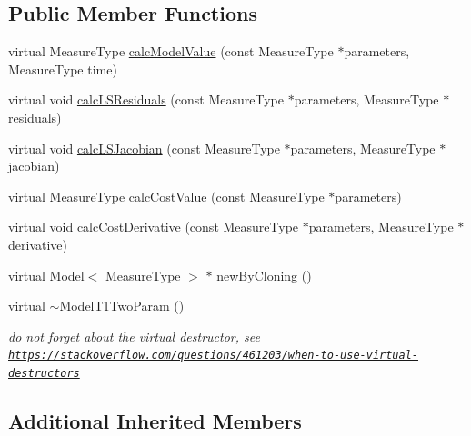 \subsection*{Public Member Functions}
\begin{DoxyCompactItemize}
\item 
virtual Measure\+Type \hyperlink{class_ox_1_1_model_t1_two_param_aaa8218e3d53e1913589d272bcbb62b47}{calc\+Model\+Value} (const Measure\+Type $\ast$parameters, Measure\+Type time)
\item 
virtual void \hyperlink{class_ox_1_1_model_t1_two_param_a8c02d34fac5a35310f6ee60209f70d45}{calc\+L\+S\+Residuals} (const Measure\+Type $\ast$parameters, Measure\+Type $\ast$residuals)
\item 
virtual void \hyperlink{class_ox_1_1_model_t1_two_param_af5952a47062e6edffe78f8594cc220e4}{calc\+L\+S\+Jacobian} (const Measure\+Type $\ast$parameters, Measure\+Type $\ast$jacobian)
\item 
virtual Measure\+Type \hyperlink{class_ox_1_1_model_t1_two_param_ab4ec672167094e84f2fddc5d052d528c}{calc\+Cost\+Value} (const Measure\+Type $\ast$parameters)
\item 
virtual void \hyperlink{class_ox_1_1_model_t1_two_param_a328e0fdc6b5769ecc3327596c9b12be3}{calc\+Cost\+Derivative} (const Measure\+Type $\ast$parameters, Measure\+Type $\ast$derivative)
\item 
virtual \hyperlink{class_ox_1_1_model}{Model}$<$ Measure\+Type $>$ $\ast$ \hyperlink{class_ox_1_1_model_t1_two_param_aa090c6834141f00a966eebd6b0415e44}{new\+By\+Cloning} ()
\item 
virtual \hyperlink{class_ox_1_1_model_t1_two_param_ae6870d10db397016649989969c613f32}{$\sim$\+Model\+T1\+Two\+Param} ()\hypertarget{class_ox_1_1_model_t1_two_param_ae6870d10db397016649989969c613f32}{}\label{class_ox_1_1_model_t1_two_param_ae6870d10db397016649989969c613f32}

\begin{DoxyCompactList}\small\item\em do not forget about the virtual destructor, see \href{https://stackoverflow.com/questions/461203/when-to-use-virtual-destructors}{\tt https\+://stackoverflow.\+com/questions/461203/when-\/to-\/use-\/virtual-\/destructors} \end{DoxyCompactList}\end{DoxyCompactItemize}
\subsection*{Additional Inherited Members}


